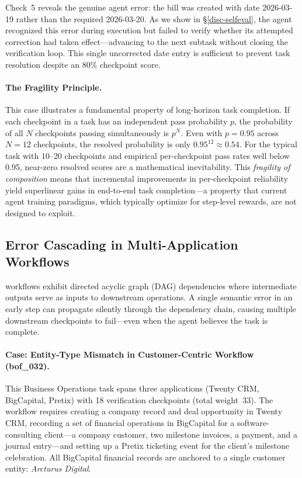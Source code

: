Check~5 reveals the genuine agent error: the bill was created with date 2026-03-19 rather than the required 2026-03-20. As we show in \S\ref{disc-selfeval}, the agent recognized this error during execution but failed to verify whether its attempted correction had taken effect---advancing to the next subtask without closing the verification loop. This single uncorrected date entry is sufficient to prevent task resolution despite an 80\% checkpoint score.

\paragraph{The Fragility Principle.}
This case illustrates a fundamental property of long-horizon task completion. If each checkpoint in a task has an independent pass probability $p$, the probability of all $N$ checkpoints passing simultaneously is $p^N$. Even with $p = 0.95$ across $N = 12$ checkpoints, the resolved probability is only $0.95^{12} \approx 0.54$. For the typical \datasetname task with 10--20 checkpoints and empirical per-checkpoint pass rates well below 0.95, near-zero resolved scores are a mathematical inevitability. This \emph{fragility of composition} means that incremental improvements in per-checkpoint reliability yield superlinear gains in end-to-end task completion---a property that current agent training paradigms, which typically optimize for step-level rewards, are not designed to exploit.


\subsection{Error Cascading in Multi-Application Workflows}
\label{disc-cascade}

\datasetname workflows exhibit directed acyclic graph (DAG) dependencies where intermediate outputs serve as inputs to downstream operations. A single semantic error in an early step can propagate silently through the dependency chain, causing multiple downstream checkpoints to fail---even when the agent believes the task is complete.

\paragraph{Case: Entity-Type Mismatch in Customer-Centric Workflow ({\ttfamily bof\_032}).}
This Business Operations task spans three applications (Twenty CRM, BigCapital, Pretix) with 18 verification checkpoints (total weight~33). The workflow requires creating a company record and deal opportunity in Twenty CRM, recording a set of financial operations in BigCapital for a software-consulting client---a company customer, two milestone invoices, a payment, and a journal entry---and setting up a Pretix ticketing event for the client's milestone celebration. All BigCapital financial records are anchored to a single customer entity: \emph{Arcturus Digital}.

